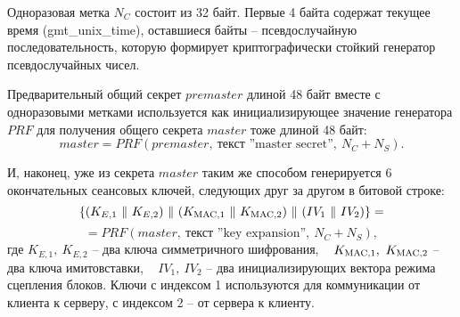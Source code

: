 





Одноразовая метка $N_C$ состоит из 32 байт. Первые 4 байта содержат текущее время (gmt\_unix\_time), оставшиеся байты -- псевдослучайную последовательность, которую формирует криптографически стойкий генератор псевдослучайных чисел.

Предварительный общий секрет $premaster$ длиной 48 байт вместе с одноразовыми метками используется как инициализирующее значение генератора $PRF$ для получения общего секрета $master$ тоже длиной 48 байт:
    \[ master = PRF(premaster, ~\text{текст ''master secret''}, ~ N_C + N_S) .\]

И, наконец, уже из секрета $master$ таким же способом генерируется 6 окончательных сеансовых ключей, следующих друг за другом в битовой строке:
    \[ \{ (K_{E,1} ~\|~ K_{E,2}) ~\|~ (K_{\textrm{MAC},1} ~\|~ K_{\textrm{MAC},2}) ~\|~ (IV_1 ~\|~ IV_2) \} = \]
        \[ = PRF(master, ~\text{текст ''key expansion''}, ~ N_C + N_S), \]
где $K_{E,1}, ~ K_{E,2}$ -- два ключа симметричного шифрования, ~ $K_{\textrm{MAC},1}, ~ K_{\textrm{MAC},2}$ -- два ключа имитовставки, ~ $IV_1, ~IV_2$ -- два инициализирующих вектора режима сцепления блоков. Ключи с индексом 1 используются для коммуникации от клиента к серверу, с индексом 2 -- от сервера к клиенту.


